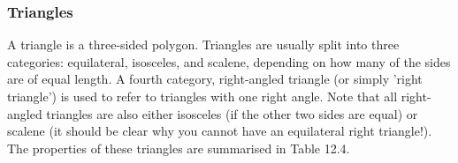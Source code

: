             \subsubsection{ Triangles}
            \nopagebreak
            \label{m39368*id317485}A triangle is a three-sided polygon. Triangles are usually split into three categories: equilateral, isosceles, and scalene, depending on how many of the sides are of equal length. A fourth category, right-angled triangle (or simply 'right triangle') is used to refer to triangles with one right angle. Note that all right-angled triangles are also either isosceles (if the other two sides are equal) or scalene (it should be clear why you cannot have an equilateral right triangle!). The properties of these triangles are summarised in Table 12.4.\par 
    \setlength\mytablespace{6\tabcolsep}
    \addtolength\mytablespace{4\arrayrulewidth}
    \setlength\mytablewidth{\linewidth}
    \setlength\mytableroom{\mytablewidth}
    \addtolength\mytableroom{-\mytablespace}
    \setlength\myfixedwidth{0pt}
    \setlength\mystarwidth{\mytableroom}
        \addtolength\mystarwidth{-\myfixedwidth}
        \divide{}

